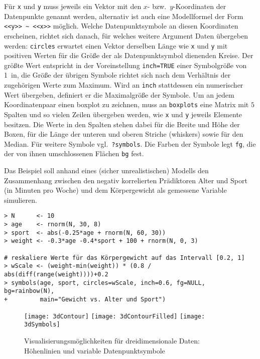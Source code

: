Für \lstinline!x! und \lstinline!y! muss jeweils ein Vektor mit den $x$- bzw.\ $y$-Koordinaten der Datenpunkte genannt werden, alternativ ist auch eine Modellformel der Form \lstinline!<<y>> ~ <<x>>! möglich. Welche Datenpunktsymbole an diesen Koordinaten erscheinen, richtet sich danach, für welches weitere Argument Daten übergeben werden: \lstinline!circles! erwartet einen Vektor derselben Länge wie \lstinline!x! und \lstinline!y! mit positiven Werten für die Größe der als Datenpunktsymbol dienenden Kreise. Der größte Wert entspricht in der Voreinstellung \lstinline!inch=TRUE! einer Symbolgröße von 1~in, die Größe der übrigen Symbole richtet sich nach dem Verhältnis der zugehörigen Werte zum Maximum. Wird an \lstinline!inch! stattdessen ein numerischer Wert übergeben, definiert er die Maximalgröße der Symbole. Um an jedem Koordinatenpaar einen boxplot zu zeichnen, muss an \lstinline!boxplots! eine Matrix mit $5$ Spalten und so vielen Zeilen übergeben werden, wie \lstinline!x! und \lstinline!y! jeweils Elemente besitzen. Die Werte in den Spalten stehen dabei für die Breite und Höhe der Boxen, für die Länge der unteren und oberen Striche (whiskers) sowie für den Median. Für weitere Symbole vgl.\ \lstinline!?symbols!. Die Farben der Symbole legt \lstinline!fg!, die der von ihnen umschlossenen Flächen \lstinline!bg! fest.

Das Beispiel soll anhand eines (sicher unrealistischen) Modells den Zusammenhang zwischen den negativ korrelierten Prädiktoren Alter und Sport (in Minuten pro Woche) und dem Körpergewicht als gemessene Variable simulieren.
\begin{lstlisting}
> N      <- 10
> age    <- rnorm(N, 30, 8)
> sport  <- abs(-0.25*age + rnorm(N, 60, 30))
> weight <- -0.3*age -0.4*sport + 100 + rnorm(N, 0, 3)

# reskaliere Werte für das Körpergewicht auf das Intervall [0.2, 1]
> wScale <- (weight-min(weight)) * (0.8 / abs(diff(range(weight))))+0.2
> symbols(age, sport, circles=wScale, inch=0.6, fg=NULL, bg=rainbow(N),
+         main="Gewicht vs. Alter und Sport")

\end{lstlisting}

\begin{figure}[ht]
\centering

\texttt{[image: 3dContour]}
\texttt{[image: 3dContourFilled]}
\texttt{[image: 3dSymbols]}
\vspace*{-1em}
\caption{Visualisierungsmöglichkeiten für dreidimensionale Daten: Höhenlinien und variable Datenpunktsymbole}
\label{fig:3dOne}
\end{figure}


